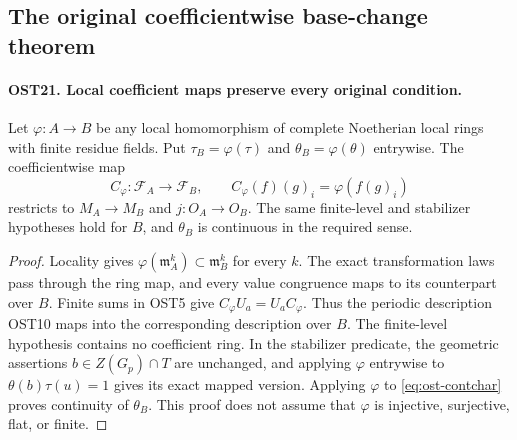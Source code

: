 \documentclass[11pt,a4paper]{article}
\numberwithin{equation}{section}
\theoremstyle{remark}\newtheorem{remark}[theorem]{Remark}
\begin{document}
\subsection{The original coefficientwise base-change theorem}

\paragraph{OST21. Local coefficient maps preserve every original condition.}
\label{claim:OST21}
Let $\varphi:A\to B$ be any local homomorphism of complete
Noetherian local rings with finite residue fields.  Put
$\tau_B=\varphi(\tau)$ and $\theta_B=\varphi(\theta)$
entrywise.  The coefficientwise map
\[
 C_\varphi:\mathcal F_A\longrightarrow\mathcal F_B,
                 \qquad C_\varphi(f)(g)_i=\varphi(f(g)_i)
\]
restricts to $M_A\to M_B$ and $j:O_A\to O_B$.
The same finite-level and stabilizer hypotheses hold for $B$,
and $\theta_B$ is continuous in the required sense.
\begin{proof}
Locality gives $\varphi(\mathfrak m_A^k)\subset\mathfrak m_B^k$
for every $k$.  The exact transformation laws pass through
the ring map, and every value congruence maps to its counterpart
over $B$.  Finite sums in OST5 give
$C_\varphi U_a=U_a C_\varphi$.  Thus the periodic description
OST10 maps into the corresponding description over $B$.
The finite-level hypothesis contains no coefficient ring.
In the stabilizer predicate, the geometric assertions
$b\in Z(G_p)\cap T$ are unchanged, and applying $\varphi$
entrywise to $\theta(b)\tau(u)=1$ gives its exact mapped
version.  Applying $\varphi$ to
\eqref{eq:ost-contchar} proves continuity of $\theta_B$.
This proof does not assume that $\varphi$ is injective,
surjective, flat, or finite.
\end{proof}

\end{document}
